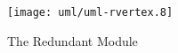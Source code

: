 \begin{figure}[htp]
  \begin{center}
    \texttt{[image: uml/uml-rvertex.8]}

    \caption{The Redundant Module}
    \label{fig:sim-modules-helpers-nodes-redundant}
  \end{center}
\end{figure}